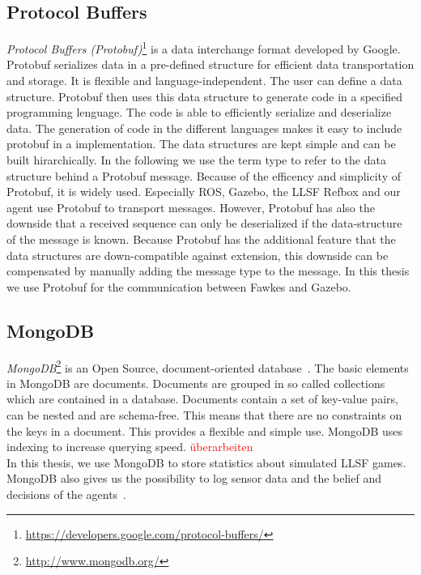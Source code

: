 \subsection{Protocol Buffers}
\textit{Protocol Buffers (Protobuf)}\footnote{\url{https://developers.google.com/protocol-buffers/}} is a data interchange format developed by Google. Protobuf serializes data in a pre-defined structure for efficient data transportation and storage. It is flexible and language-independent. The user can define a data structure. Protobuf then uses this data structure to generate code in a specified programming lenguage. The code is able to efficiently serialize and deserialize data. The generation of code in the different languages makes it easy to include protobuf in a implementation. The data structures are kept simple and can be built hirarchically. In the following we use the term type to refer to the data structure behind a Protobuf message. Because of the efficency and simplicity of Protobuf, it is widely used. Especially ROS, Gazebo, the LLSF Refbox and our agent use Protobuf to transport messages. However, Protobuf has also the downside that a received sequence can only be deserialized if the data-structure of the message is known. Because Protobuf has the additional feature that the data structures are down-compatible against extension, this downside can be compensated by manually adding the message type to the message. In this thesis we use Protobuf for the communication between Fawkes and Gazebo.

\subsection{MongoDB}
\textit{MongoDB}\footnote{\url{http://www.mongodb.org/}} is an Open Source, document-oriented database~\cite{mongodb,KlingenDA}. The basic elements in MongoDB are documents. Documents are grouped in so called collections which are contained in a database. Documents contain a set of key-value pairs, can be nested and are schema-free. This means that there are no constraints on the keys in a document. This provides a flexible and simple use. MongoDB uses indexing to increase querying speed. \textcolor{red}{überarbeiten}\\
In this thesis, we use MongoDB to store statistics about simulated LLSF games. MongoDB also gives us the possibility to log sensor data and the belief and decisions of the agents~\cite{KlingenDA}.
